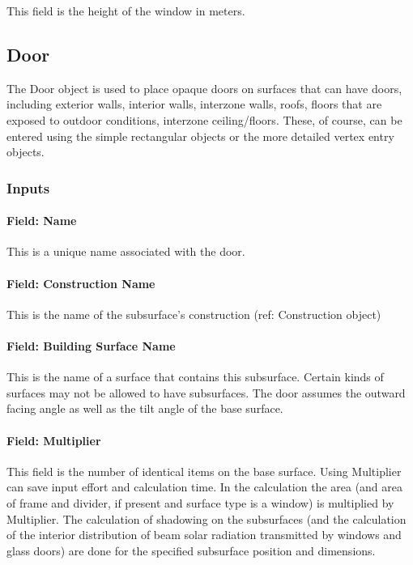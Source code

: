 This field is the height of the window in meters.

\subsection{Door}\label{door}

The Door object is used to place opaque doors on surfaces that can have doors, including exterior walls, interior walls, interzone walls, roofs, floors that are exposed to outdoor conditions, interzone ceiling/floors. These, of course, can be entered using the simple rectangular objects or the more detailed vertex entry objects.

\subsubsection{Inputs}\label{inputs-15-016}

\paragraph{Field: Name}\label{field-name-11-015}

This is a unique name associated with the door.

\paragraph{Field: Construction Name}\label{field-construction-name-11}

This is the name of the subsurface's construction (ref: Construction object)

\paragraph{Field: Building Surface Name}\label{field-building-surface-name-1}

This is the name of a surface that contains this subsurface. Certain kinds of surfaces may not be allowed to have subsurfaces. The door assumes the outward facing angle as well as the tilt angle of the base surface.

\paragraph{Field: Multiplier}\label{field-multiplier-2}

This field is the number of identical items on the base surface. Using Multiplier can save input effort and calculation time. In the calculation the area (and area of frame and divider, if present and surface type is a window) is multiplied by Multiplier. The calculation of shadowing on the subsurfaces (and the calculation of the interior distribution of beam solar radiation transmitted by windows and glass doors) are done for the specified subsurface position and dimensions.


